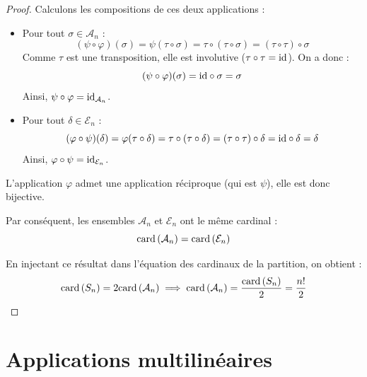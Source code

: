 \documentclass[12pt, a4paper]{report}
\begin{document}
\begin{proof}
    Calculons les compositions de ces deux applications :
    \begin{itemize}
        \item Pour tout $\sigma \in \mathcal{A}_n$ :
        $$(\psi \circ \varphi)(\sigma) = \psi(\tau \circ \sigma) = \tau \circ (\tau \circ \sigma) = (\tau \circ \tau) \circ \sigma$$
        Comme $\tau$ est une transposition, elle est involutive ($\tau \circ \tau = \mathrm{id}$). On a donc :
        $$(\psi \circ \varphi)(\sigma) = \mathrm{id} \circ \sigma = \sigma$$
        Ainsi, $\psi \circ \varphi = \mathrm{id}_{\mathcal{A}_n}$.

        \item Pour tout $\delta \in \mathcal{E}_n$ :
        $$(\varphi \circ \psi)(\delta) = \varphi(\tau \circ \delta) = \tau \circ (\tau \circ \delta) = (\tau \circ \tau) \circ \delta = \mathrm{id} \circ \delta = \delta$$
        Ainsi, $\varphi \circ \psi = \mathrm{id}_{\mathcal{E}_n}$.
    \end{itemize}

    L'application $\varphi$ admet une application réciproque (qui est $\psi$), elle est donc bijective. 

    Par conséquent, les ensembles $\mathcal{A}_n$ et $\mathcal{E}_n$ ont le même cardinal :
    $$\mathrm{card}\left(\mathcal{A}_n\right) = \mathrm{card}\left(\mathcal{E}_n\right)$$

    En injectant ce résultat dans l'équation des cardinaux de la partition, on obtient :
    $$\mathrm{card}\left(S_n\right) = 2 \mathrm{card}\left(\mathcal{A}_n\right) \implies \mathrm{card}\left(\mathcal{A}_n\right) = \frac{\mathrm{card}\left(S_n\right)}{2} = \frac{n!}{2}$$
\end{proof}

\chapter{Applications multilinéaires}
\end{document}
